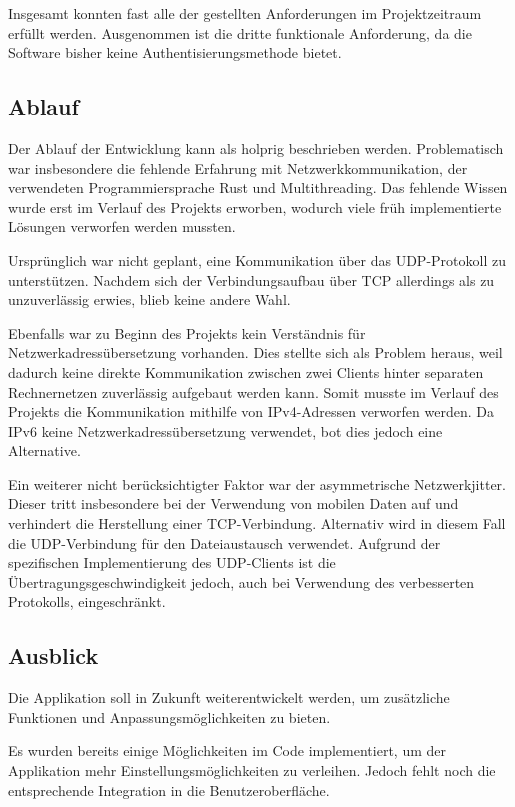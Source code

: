 Insgesamt konnten fast alle der gestellten Anforderungen im Projektzeitraum erfüllt werden. Ausgenommen ist die dritte funktionale Anforderung, da die Software bisher keine Authentisierungsmethode bietet.

\subsection{Ablauf}
Der Ablauf der Entwicklung kann als holprig beschrieben werden. Problematisch war insbesondere die fehlende Erfahrung mit Netzwerkkommunikation, der verwendeten Programmiersprache Rust und Multithreading. Das fehlende Wissen wurde erst im Verlauf des Projekts erworben, wodurch viele früh implementierte Lösungen verworfen werden mussten.

Ursprünglich war nicht geplant, eine Kommunikation über das UDP-Protokoll zu unterstützen. Nachdem sich der Verbindungsaufbau über TCP allerdings als zu unzuverlässig erwies, blieb keine andere Wahl.

Ebenfalls war zu Beginn des Projekts kein Verständnis für Netzwerkadressübersetzung vorhanden. Dies stellte sich als Problem heraus, weil dadurch keine direkte Kommunikation zwischen zwei Clients hinter separaten Rechnernetzen zuverlässig aufgebaut werden kann. Somit musste im Verlauf des Projekts die Kommunikation mithilfe von IPv4-Adressen verworfen werden. Da IPv6 keine Netzwerkadressübersetzung verwendet, bot dies jedoch eine Alternative.

Ein weiterer nicht berücksichtigter Faktor war der asymmetrische Netzwerkjitter. Dieser tritt insbesondere bei der Verwendung von mobilen Daten auf und verhindert die Herstellung einer TCP-Verbindung. Alternativ wird in diesem Fall die UDP-Verbindung für den Dateiaustausch verwendet. Aufgrund der spezifischen Implementierung des UDP-Clients ist die Übertragungsgeschwindigkeit jedoch, auch bei Verwendung des verbesserten Protokolls, eingeschränkt.

\subsection{Ausblick}
Die Applikation soll in Zukunft weiterentwickelt werden, um zusätzliche Funktionen und Anpassungsmöglichkeiten zu bieten.

Es wurden bereits einige Möglichkeiten im Code implementiert, um der Applikation mehr Einstellungsmöglichkeiten zu verleihen. Jedoch fehlt noch die entsprechende Integration in die Benutzeroberfläche.

